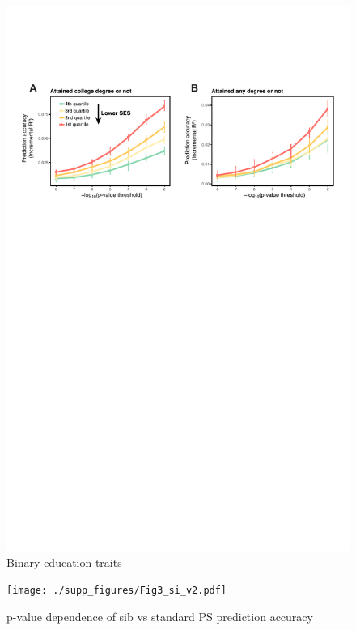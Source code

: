 \documentclass[hidelinks, 12pt]{article}
\begin{document}
\begin{figure}[h!]
\centering
\includegraphics[width=\textwidth]{./supp_figures/binary_edu_traits.pdf}
\caption{Binary education traits}
\end{figure}


\begin{figure}[h!]
\centering
\texttt{[image: ./supp\_figures/Fig3\_si\_v2.pdf]}
\caption{p-value dependence of sib vs standard PS prediction accuracy}
\end{figure}
\end{document}
